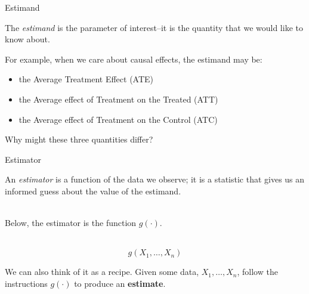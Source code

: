 \documentclass[xcolor={dvipsnames},handout]{beamer}
\begin{document}
\begin{frame}{Estimand}

The \textit{estimand} is the parameter of interest--it is the quantity that we would like to know about.



For example, when we care about causal effects, the estimand may be:

\begin{itemize}
\item the Average Treatment Effect (ATE)
\item  the Average effect of Treatment on the Treated (ATT)
\item  the Average effect of Treatment on the Control (ATC)
\end{itemize}



Why might these three quantities differ?
%
%




\end{frame}



\begin{frame}{Estimator}

An \textit{estimator} is a function of the data we observe; it is a statistic that gives us an informed guess about the value of the estimand. \\~\

Below, the estimator is the function $g(\cdot)$. \\~\

$$
g(X_1, \dots, X_n)
$$

We can also think of it as a recipe. Given some data, $X_1, \dots, X_n$, follow the instructions $g(\cdot)$ to produce an \textbf{estimate}.

\end{frame}


\end{document}

